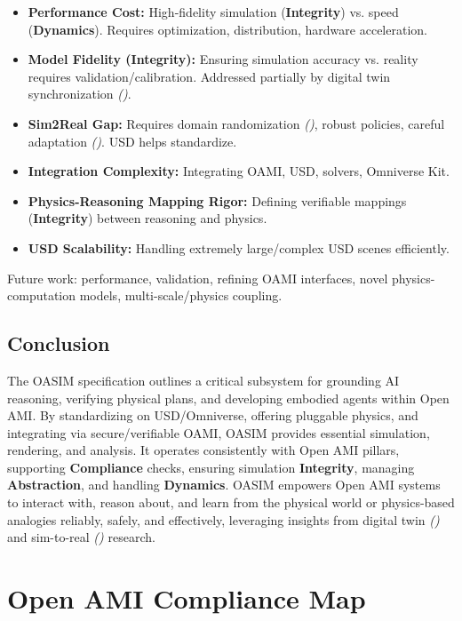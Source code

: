 \documentclass[12pt,a4paper]{report}
\renewcommand{\citep}[1]{\textit{\scriptsize{(\cite{#1})}}}
\newcommand{\Integrity}{\textbf{Integrity}}
\newcommand{\Abstraction}{\textbf{Abstraction}}
\newcommand{\Dynamics}{\textbf{Dynamics}}
\begin{document}
	\begin{itemize}
		\item \textbf{Performance Cost:} High-fidelity simulation (\Integrity) vs. speed (\Dynamics). Requires optimization, distribution, hardware acceleration.
		\item \textbf{Model Fidelity (\Integrity):} Ensuring simulation accuracy vs. reality requires validation/calibration. Addressed partially by digital twin synchronization \citep{Berg2025DigitalTwin}.
		\item \textbf{Sim2Real Gap:} Requires domain randomization \citep{Tobin_Domain_Randomization_2017}, robust policies, careful adaptation \citep{Josifovski_SCDA_2025}. USD helps standardize.
		\item \textbf{Integration Complexity:} Integrating OAMI, USD, solvers, Omniverse Kit.
		\item \textbf{Physics-Reasoning Mapping Rigor:} Defining verifiable mappings (\Integrity) between reasoning and physics.
		\item \textbf{USD Scalability:} Handling extremely large/complex USD scenes efficiently.
	\end{itemize}
	Future work: performance, validation, refining OAMI interfaces, novel physics-computation models, multi-scale/physics coupling.
	
	\section{Conclusion}
	\label{app:oasim_conclusion}
	
	The OASIM specification outlines a critical subsystem for grounding AI reasoning, verifying physical plans, and developing embodied agents within Open AMI. By standardizing on USD/Omniverse, offering pluggable physics, and integrating via secure/verifiable OAMI, OASIM provides essential simulation, rendering, and analysis. It operates consistently with Open AMI pillars, supporting \textbf{Compliance} checks, ensuring simulation \Integrity, managing \Abstraction, and handling \Dynamics. OASIM empowers Open AMI systems to interact with, reason about, and learn from the physical world or physics-based analogies reliably, safely, and effectively, leveraging insights from digital twin \citep{Li2025DigitalTwins, Berg2025DigitalTwin} and sim-to-real \citep{Josifovski_SCDA_2025} research.
	
		\chapter{Open AMI Compliance Map}
	\label{app:compliance_map}
	
\end{document}
